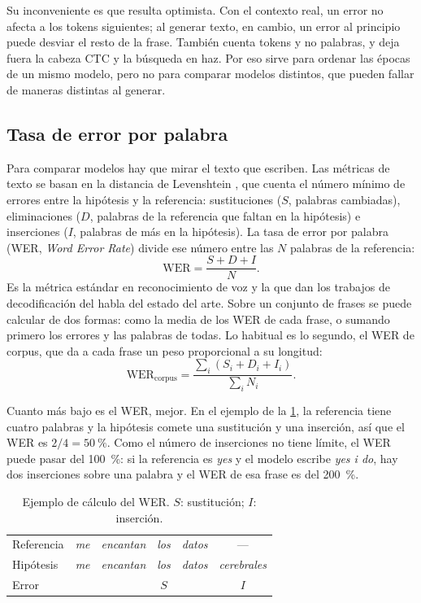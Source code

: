 Su inconveniente es que resulta optimista. Con el contexto real, un error no afecta a los tokens siguientes; al generar texto, en cambio, un error al principio puede desviar el resto de la frase. También cuenta tokens y no palabras, y deja fuera la cabeza CTC y la búsqueda en haz. Por eso sirve para ordenar las épocas de un mismo modelo, pero no para comparar modelos distintos, que pueden fallar de maneras distintas al generar.

\subsection{Tasa de error por palabra}

Para comparar modelos hay que mirar el texto que escriben. Las métricas de texto se basan en la distancia de Levenshtein \cite{levenshtein1966}, que cuenta el número mínimo de errores entre la hipótesis y la referencia: sustituciones ($S$, palabras cambiadas), eliminaciones ($D$, palabras de la referencia que faltan en la hipótesis) e inserciones ($I$, palabras de más en la hipótesis). La tasa de error por palabra (WER, \textit{Word Error Rate}) divide ese número entre las $N$ palabras de la referencia:
\begin{equation}
  \mathrm{WER} = \frac{S + D + I}{N}.
  \label{eq:wer}
\end{equation}
Es la métrica estándar en reconocimiento de voz y la que dan los trabajos de decodificación del habla del estado del arte. Sobre un conjunto de frases se puede calcular de dos formas: como la media de los WER de cada frase, o sumando primero los errores y las palabras de todas. Lo habitual es lo segundo, el WER de corpus, que da a cada frase un peso proporcional a su longitud:
\begin{equation}
  \mathrm{WER}_{\mathrm{corpus}} = \frac{\sum_{i} (S_i + D_i + I_i)}{\sum_{i} N_i}.
  \label{eq:wer-corpus}
\end{equation}

Cuanto más bajo es el WER, mejor. En el ejemplo de la \cref{tab:ejemplo-wer}, la referencia tiene cuatro palabras y la hipótesis comete una sustitución y una inserción, así que el WER es $2/4 = \SI{50}{\percent}$. Como el número de inserciones no tiene límite, el WER puede pasar del \SI{100}{\percent}: si la referencia es \textit{yes} y el modelo escribe \textit{yes i do}, hay dos inserciones sobre una palabra y el WER de esa frase es del \SI{200}{\percent}.

\begin{table}[htbp]
  \centering
  \caption{Ejemplo de cálculo del WER. $S$: sustitución; $I$: inserción.}
  \label{tab:ejemplo-wer}
  \begin{tabular}{lccccc}
    \hline
    Referencia & \textit{me} & \textit{encantan} & \textit{los} & \textit{datos} & --- \\
    Hipótesis  & \textit{me} & \textit{encantan} & \textit{los}  & \textit{datos} & \textit{cerebrales} \\
    Error      &            &               & $S$           &                & $I$ \\
    \hline
  \end{tabular}
\end{table}

